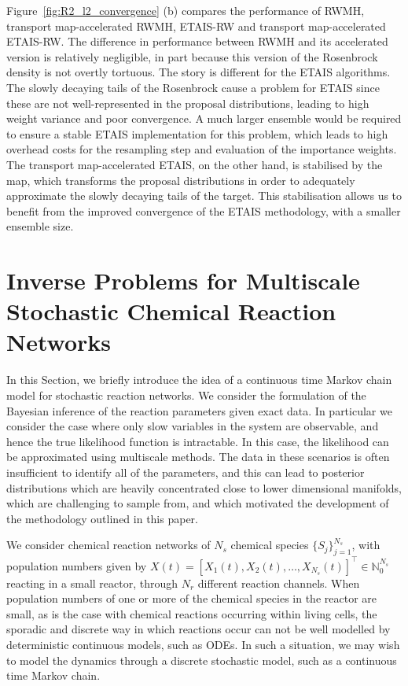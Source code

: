 \documentclass[final]{siamltex}
\newcommand{\edit}[1]{#1}
\begin{document}
Figure~\ref{fig:R2_l2_convergence} (b) compares the performance of
RWMH, transport map-accelerated RWMH, ETAIS-RW and transport
map-accelerated ETAIS-RW. The difference in performance between RWMH
and its accelerated version is relatively negligible, in part because
this version of the Rosenbrock density is not overtly tortuous. The story
is different for the ETAIS algorithms. The slowly decaying tails of
the Rosenbrock cause a problem for ETAIS since these are not
well-represented in the proposal distributions, leading to high weight
variance and poor convergence. A much larger
ensemble would be required to ensure a stable ETAIS implementation for this
problem, which leads to high overhead costs for the resampling step
and evaluation of the importance weights. The transport map-accelerated
ETAIS, on the other hand, is stabilised by the map, which transforms the proposal
distributions in order to adequately approximate the slowly decaying
tails of the target. This stabilisation allows us to benefit from the
improved convergence of the ETAIS methodology, with a smaller ensemble
size. 



\section{Inverse Problems for Multiscale Stochastic Chemical Reaction
  Networks}\label{sec:multi}
\edit{In this Section, we briefly introduce the idea of a continuous
  time Markov chain model for stochastic reaction networks. We consider the formulation of the Bayesian inference of
  the reaction parameters given exact data. In particular we consider
  the case where only slow variables in the system are observable, and
  hence the true likelihood function is intractable. In this case, the
  likelihood can be approximated using multiscale methods. The data in
  these scenarios is often insufficient to identify all of the
  parameters, and this can lead to posterior distributions which are
  heavily concentrated close to lower dimensional manifolds, which are
  challenging to sample from, and which motivated the development of
  the methodology outlined in this paper.}

We consider chemical reaction networks of $N_s$ chemical species $\{S_j\}_{j=1}^{N_s}$,
with population numbers given by $X(t) = [X_1(t), X_2(t), \ldots, X_{N_s}(t)]^\top \in
\mathbb{N}_0^{N_s}$ reacting in a small reactor, through $N_r$ different reaction
channels. When population numbers of one or more of the chemical
species in the reactor are small, as is the case with chemical
reactions occurring within living cells, the sporadic and discrete way
in which reactions occur can not be well modelled by deterministic
continuous models, such as ODEs. In such a situation, we may wish to
model the dynamics through a discrete stochastic model, such as a
continuous time Markov chain.
\end{document}
